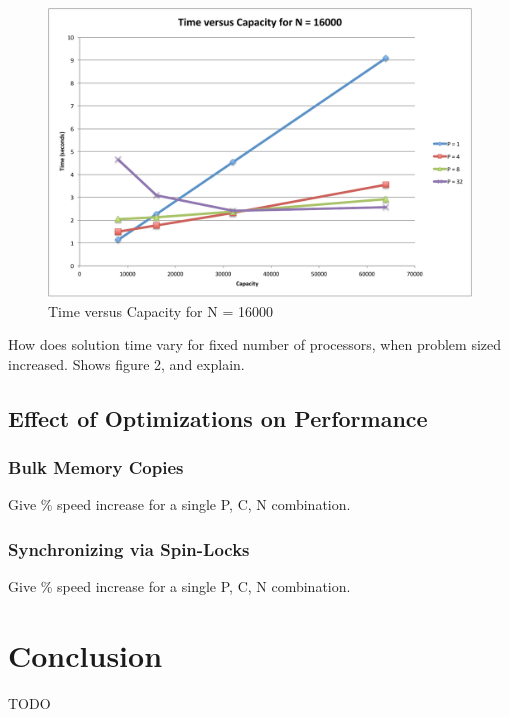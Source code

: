 \documentclass[11pt]{article} %
\begin{document}
\begin{figure}
\begin{centering}
\includegraphics[width=0.5\paperwidth]{figures/TvsC.pdf}
\caption{Time versus Capacity for N = 16000}
\label{TvsC}
\end{centering}
\end{figure}

How does solution time vary for fixed number of processors, when problem sized increased. Shows figure 2, and explain.

\subsection{Effect of Optimizations on Performance}

\subsubsection{Bulk Memory Copies}

Give \% speed increase for a single P, C, N combination.

\subsubsection{Synchronizing via Spin-Locks}

Give \% speed increase for a single P, C, N combination.

\section{Conclusion}

TODO
\end{document}
